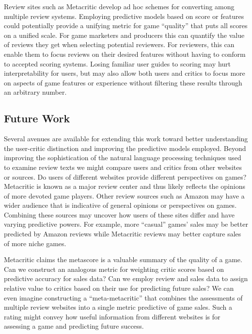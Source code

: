 \documentclass[letterpaper]{article}
\begin{document}
Review sites such as Metacritic develop ad hoc schemes for converting among multiple review systems. Employing predictive models based on score or features could potentially provide a unifying metric for game ``quality'' that puts all scores on a unified scale. For game marketers and producers this can quantify the value of reviews they get when selecting potential reviewers. For reviewers, this can enable them to focus reviews on their desired features without having to conform to accepted scoring systems. Losing familiar user guides to scoring may hurt interpretability for users, but may also allow both users and critics to focus more on aspects of game features or experience without filtering these results through an arbitrary number.

\subsection{Future Work}

Several avenues are available for extending this work toward better understanding the user-critic distinction and improving the predictive models employed. Beyond improving the sophistication of the natural language processing techniques used to examine review texts we might compare users and critics from other websites or sources. Do users of different websites provide different perspectives on games? Metacritic is known as a major review center and thus likely reflects the opinions of more devoted game players. Other review sources such as Amazon may have a wider audience that is indicative of general opinions or perspectives on games. Combining these sources may uncover how users of these sites differ and have varying predictive powers. For example, more ``casual'' games' sales may be better predicted by Amazon reviews while Metacritic reviews may better capture sales of more niche games.

Metacritic claims the metascore is a valuable summary of the quality of a game. Can we construct an analogous metric for weighting critic scores based on predictive accuracy for sales data? Can we employ review and sales data to assign relative value to critics based on their use for predicting future sales? We can even imagine constructing a ``meta-metacritic'' that combines the assessments of multiple review websites into a single metric predictive of game sales. Such a rating might convey how useful information from different websites is for assessing a game and predicting future success.
\end{document}
